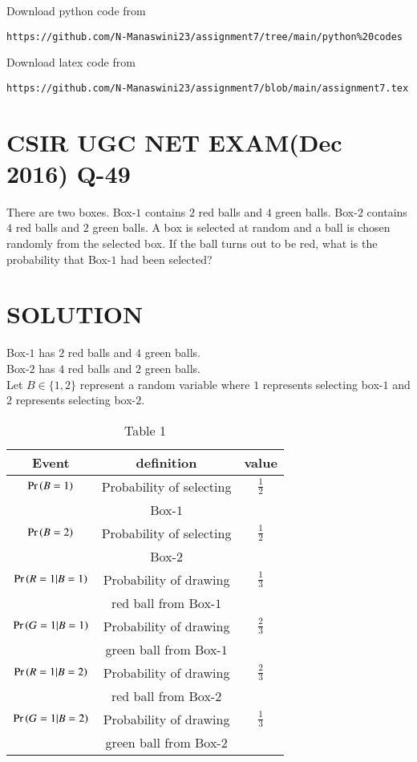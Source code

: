 \documentclass[journal,12pt,twocolumn]{IEEEtran}
\begin{document}
\renewcommand{\thefigure}{\theenumi}
\renewcommand{\thetable}{\theenumi}
Download python code from 
\begin{lstlisting}
https://github.com/N-Manaswini23/assignment7/tree/main/python%20codes
\end{lstlisting}
%
Download latex code from 
\begin{lstlisting}
https://github.com/N-Manaswini23/assignment7/blob/main/assignment7.tex
\end{lstlisting}
%

\section*{CSIR UGC NET EXAM(Dec 2016) Q-49}
There are two boxes. Box-$1$ contains $2$ red balls and $4$ green balls. Box-$2$ contains $4$ red balls and $2$ green balls. A box is selected at random and a ball is chosen randomly from the selected box. If the ball turns out to be red, what is the probability that Box-$1$ had been selected?
\section*{SOLUTION}
Box-$1$ has $2$ red balls and $4$ green balls.\\
Box-$2$ has $4$ red balls and $2$ green balls.\\
Let $B \in \{1,2\} $ represent a random variable where $1$ represents selecting box-$1$ and $2$ represents selecting box-$2$.

\begin{table}[h!]
\resizebox{\columnwidth}{!}
{ 
\begin{tabular}{|c|c|c|}
\hline
Event & definition & value\\
\hline
$ \Pr\left(B=1\right) $ & Probability of selecting  & $\frac{1}{2}$\\
&Box-$1$ & \\
\hline
$ \Pr\left(B=2\right) $ & Probability of selecting & $\frac{1}{2}$ \\
& Box-$2$& \\
\hline
$\Pr\left(R=1|B=1\right)$ & Probability of drawing &  $\frac{1}{3}$   \\
&  red ball from Box-$1$ &\\
\hline
$\Pr\left(G=1|B=1\right)$ & Probability of drawing &  $\frac{2}{3}$   \\
&  green ball from Box-$1$ &\\
\hline
$\Pr\left(R=1|B=2\right)$ & Probability of drawing &  $\frac{2}{3}$   \\
&  red ball from Box-$2$ &\\
\hline
$\Pr\left(G=1|B=2\right)$ & Probability of drawing &  $\frac{1}{3}$   \\
&  green ball from Box-$2$ &\\
\hline
\end{tabular}
}
\caption{Table 1} 
\label{tab:1}
\end{table}
\end{document}

